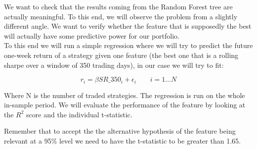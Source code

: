 We want to check that the results coming from the Random Forest tree are actually meaningful. To this end, we will observe the problem from a slightly different angle. We want to verify whether the feature that is supposedly the best will actually have some predictive power for our portfolio.\\
To this end we will run a simple regression where we will try to predict the future one-week return of a strategy given one feature (the best one that is a rolling sharpe over a window of 350 trading days), in our case we will try to fit:

\begin{equation} \label{regression}
r_i = \beta SR\_350_i + \epsilon_i \qquad i=1\dots N
\end{equation}

Where N is the number of traded strategies. The regression is run on the whole in-sample period. We will evaluate the performance of the feature by looking at the $R^2$ score and the individual t-statistic.


Remember that to accept the the alternative hypothesis of the feature being relevant at a 95\% level we need to have the t-statistic to be greater than 1.65. 